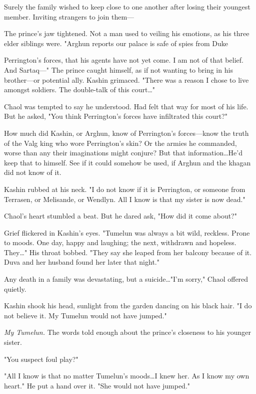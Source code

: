Surely the family wished to keep close to one another after losing their youngest member. Inviting strangers to join them---

The prince's jaw tightened. Not a man used to veiling his emotions, as his three elder siblings were. "Arghun reports our palace is safe of spies from Duke

Perrington's forces, that his agents have not yet come. I am not of that belief. And Sartaq---" The prince caught himself, as if not wanting to bring in his brother---or potential ally. Kashin grimaced. "There was a reason I chose to live amongst soldiers. The double-talk of this court\ldots"

Chaol was tempted to say he understood. Had felt that way for most of his life. But he asked, "You think Perrington's forces have infiltrated this court?"

How much did Kashin, or Arghun, know of Perrington's forces---know the truth of the Valg king who wore Perrington's skin? Or the armies he commanded, worse than any their imaginations might conjure? But that information\ldots He'd keep that to himself. See if it could somehow be used, if Arghun and the khagan did not know of it.

Kashin rubbed at his neck. "I do not know if it is Perrington, or someone from Terrasen, or Melisande, or Wendlyn. All I know is that my sister is now dead."

Chaol's heart stumbled a beat. But he dared ask, "How did it come about?"

Grief flickered in Kashin's eyes. "Tumelun was always a bit wild, reckless. Prone to moods. One day, happy and laughing; the next, withdrawn and hopeless. They\ldots" His throat bobbed. "They say she leaped from her balcony because of it. Duva and her husband found her later that night."

Any death in a family was devastating, but a suicide\ldots "I'm sorry," Chaol offered quietly.

Kashin shook his head, sunlight from the garden dancing on his black hair. "I do not believe it. My Tumelun would not have jumped."

\emph{My Tumelun.} The words told enough about the prince's closeness to his younger sister.

"You suspect foul play?"

"All I know is that no matter Tumelun's moods\ldots I knew her. As I know my own heart." He put a hand over it. "She would not have jumped."

